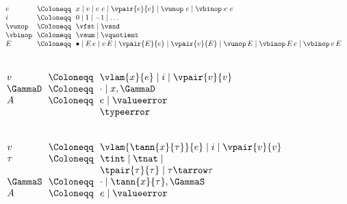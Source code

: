 \begin{flushleft}
$\begin{array}{l@{~~}c@{~~}l}
  e & \Coloneqq & x \mid v \mid e~e \mid \vpair{e}{e} \mid \vunop~e \mid \vbinop~e~e
\\
  i & \Coloneqq & 0 \mid 1 \mid -1 \mid \ldots
\\
  \vunop & \Coloneqq & \vfst \mid \vsnd
\\
  \vbinop & \Coloneqq & \vsum \mid \vquotient
\\
  E & \Coloneqq & \bullet \mid E\,e \mid v\,E \mid \vpair{E}{e} \mid \vpair{v}{E} \mid \vunop\,E \mid
            \vbinop\,E\,e \mid \vbinop\,v\,E
\end{array}$

\medskip
\begin{minipage}[t]{0.5\columnwidth}
\\
$\begin{array}{l@{~~}c@{~~}l}
  v & \Coloneqq & \vlam{x}{e} \mid i \mid \vpair{v}{v}
\\
  \GammaD & \Coloneqq & \cdot \mid x,\GammaD
\\
  A & \Coloneqq & e \mid \valueerror
\\ & & \typeerror
\end{array}$

\end{minipage}%
\begin{minipage}[t]{0.5\columnwidth}
\\
$\begin{array}{l@{~~}c@{~~}l}
  v & \Coloneqq & \vlam{\tann{x}{\tau}}{e} \mid i \mid \vpair{v}{v}
\\
  \tau & \Coloneqq & \tint \mid \tnat \mid
\\ & & \tpair{\tau}{\tau} \mid \tau \tarrow \tau
\\
  \GammaS & \Coloneqq & \cdot \mid \tann{x}{\tau},\GammaS
\\
  A & \Coloneqq & e \mid \valueerror
\end{array}$
\end{minipage}

\medskip
\begin{minipage}[t]{0.5\columnwidth}
\begin{mathpar}
\end{mathpar}
\end{minipage}%
\begin{minipage}[t]{0.5\columnwidth}
\begin{mathpar}
\end{mathpar}
\end{minipage}


\end{flushleft}
